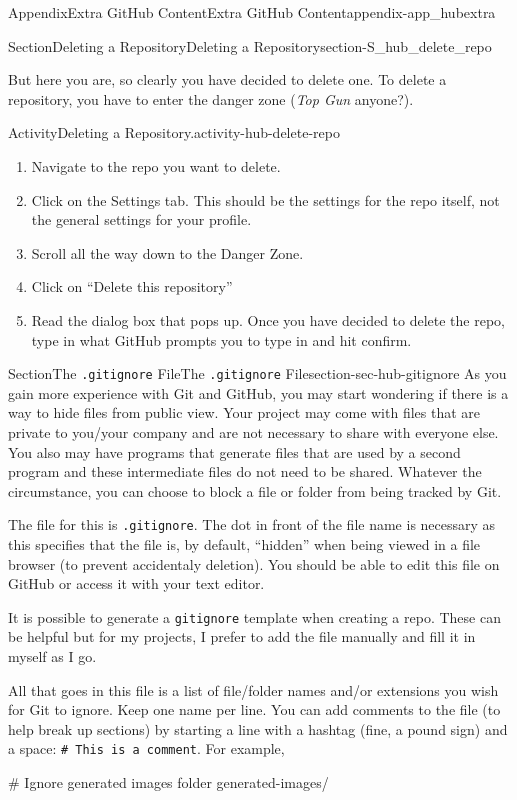 \documentclass[twoside,10pt,]{book}
\newcommand{\mono}[1]{\texttt{#1}}
\newcommand{\pubtitle}[1]{\textsl{#1}}
\begin{document}
\begin{appendixptx}{Appendix}{Extra GitHub Content}{}{Extra GitHub Content}{}{}{appendix-app_hubextra}
\begin{sectionptx}{Section}{Deleting a Repository}{}{Deleting a Repository}{}{}{section-S_hub_delete_repo}
\par
But here you are, so clearly you have decided to delete one. To delete a repository, you have to enter the danger zone (\pubtitle{Top Gun} anyone?).%
\begin{activity}{Activity}{Deleting a Repository.}{activity-hub-delete-repo}%
\begin{enumerate}[font=\bfseries,label=(\alph*),ref=\alph*]%
\item{}Navigate to the repo you want to delete.%
\item{}Click on the Settings tab. This should be the settings for the repo itself, not the general settings for your profile.%
\item{}Scroll all the way down to the Danger Zone.%
\item{}Click on ``Delete this repository''%
\item{}Read the dialog box that pops up. Once you have decided to delete the repo, type in what GitHub prompts you to type in and hit confirm.%
\end{enumerate}%
\end{activity}%
\end{sectionptx}
%
%
\typeout{************************************************}
\typeout{Section B.7 The \mono{.gitignore} File}
\typeout{************************************************}
%
\begin{sectionptx}{Section}{The \mono{.gitignore} File}{}{The \mono{.gitignore} File}{}{}{section-sec-hub-gitignore}
As you gain more experience with Git and GitHub, you may start wondering if there is a way to hide files from public view. Your project may come with files that are private to you\slash{}your company and are not necessary to share with everyone else. You also may have programs that generate files that are used by a second program and these intermediate files do not need to be shared. Whatever the circumstance, you can choose to block a file or folder from being tracked by Git.%
\par
The file for this is \mono{.gitignore}. The dot in front of the file name is necessary as this specifies that the file is, by default, ``hidden'' when being viewed in a file browser (to prevent accidentaly deletion). You should be able to edit this file on GitHub or access it with your text editor.%
\par
It is possible to generate a \mono{gitignore} template when creating a repo. These can be helpful but for my projects, I prefer to add the file manually and fill it in myself as I go.%
\par
All that goes in this file is a list of file\slash{}folder names and\slash{}or extensions you wish for Git to ignore. Keep one name per line. You can add comments to the file (to help break up sections) by starting a line with a hashtag (fine, a pound sign) and a space: \mono{\# This is a comment}. For example,%
\begin{codedisplay}
# Ignore generated images folder
generated-images/


\end{codedisplay}
\end{sectionptx}
\end{appendixptx}
\end{document}
